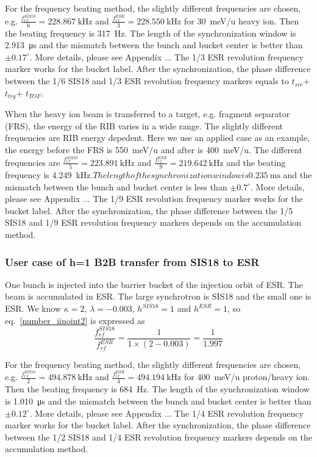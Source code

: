 For the frequency beating method, the slightly different frequencies are chosen, e.g. $\frac{f_{rf}^{SIS18}}{6}=\SI{228.867}{\kHz}$ and $\frac{f_{rf}^{ESR}}{3}=\SI{228.550}{\kHz}$ for \SI{30}{meV/\atomicmassunit} heavy ion. Then the beating frequency is \SI{317}{\Hz}. The length of the synchronization window is \SI{2.913}{\us} and the mismatch between the bunch and bucket center is better than $\pm0.17^\circ$. More details, please see Appendix ... The 1/3 ESR revolution frequency marker works for the bucket label. After the synchronization, the phase difference between the 1/6 SIS18 and 1/3 ESR revolution frequency markers equals to $t_{src}$+$t_{trg}$+ $t_{TOF}$.

When the heavy ion beam is transferred to a target, e.g. fragment separator (FRS), the energy of the RIB varies in a wide range. The slightly different frequencies are RIB energy depedent. Here we use an applied case as an example, the energy before the FRS is \SI{550}{meV/\atomicmassunit} and after is \SI{400}{meV/\atomicmassunit}. The different frequencies are   $\frac{f_{rf}^{SIS18}}{5}=\SI{223.891}{\kHz}$ and $\frac{f_{rf}^{ESR}}{9}=\SI{219.642}{\kHz}$ and the beating frequency is \SI{4.249}{\kHz}$. The length of the synchronization window is \SI{0.235}{\ms}$ and the mismatch between the bunch and bucket center is less than $\pm0.7^\circ$. More details, please see Appendix ... The 1/9 ESR revolution frequency marker works for the bucket label. After the synchronization, the phase difference between the 1/5 SIS18 and 1/9 ESR revolution frequency markers depends on the accumulation method. 

\subsubsection{User case of h=1 B2B transfer from SIS18 to ESR} 
One bunch is injected into the barrier bucket of the injection orbit of ESR. The beam is accumulated in ESR. The large synchrotron is SIS18 and the small one is ESR. We know $\kappa=2$, $\lambda=-0.003$, $h^{SIS18}=1$ and $h^{ESR}=1$, so eq.~\ref{number_iinoint2} is expressed as
\begin{equation}
\frac {f_{rf}^{SIS18}}{f_{rf}^{ESR}}= \frac {1 }{1 \times( 2- 0.003)}=\frac{1}{1.997}
\end{equation}

For the frequency beating method, the slightly different frequencies are chosen, e.g. $\frac{f_{rf}^{SIS18}}{2}=\SI{494.878}{\kHz}$ and $\frac{f_{rf}^{ESR}}{4}=\SI{494.194}{\kHz}$ for \SI{400}{meV/\atomicmassunit} proton/heavy ion. Then the beating frequency is \SI{684}{\Hz}. The length of the synchronization window is \SI{1.010}{\us} and the mismatch between the bunch and bucket center is better than $\pm0.12^\circ$. More details, please see Appendix ... The 1/4 ESR revolution frequency marker works for the bucket label. After the synchronization, the phase difference between the 1/2 SIS18 and 1/4 ESR revolution frequency markers depends on the accumulation method.

